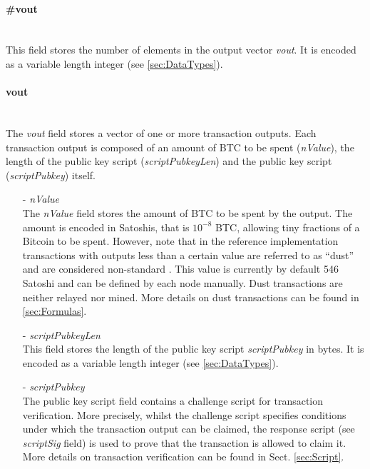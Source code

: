 \paragraph{\#vout}~\\
This field stores the number of elements in the output vector \textit{vout}. It is encoded as a variable length integer (see \ref{sec:DataTypes}).

\paragraph{vout}~\\
The \textit{vout} field stores a vector of one or more transaction outputs. Each transaction output is composed of an amount of BTC to be spent (\textit{nValue}), the length of the public key script (\textit{scriptPubkeyLen}) and the public key script (\textit{scriptPubkey}) itself.

\begin{itemize}
\item[-] \textit{nValue}~\\
The \textit{nValue} field stores the amount of BTC to be spent by the output. The amount is encoded in Satoshis, that is $10^{-8}$ BTC, allowing tiny fractions of a Bitcoin to be spent. However, note that in the reference implementation transactions with outputs less than a certain value are referred to as ``dust'' and are considered non-standard \cite{DustTransactions}. This value is currently by default 546 Satoshi and can be defined by each node manually. Dust transactions are neither relayed nor mined. More details on dust transactions can be found in \ref{sec:Formulas}.

\item[-] \textit{scriptPubkeyLen}~\\
This field stores the length of the public key script \textit{scriptPubkey} in bytes. It is encoded as a variable length integer (see \ref{sec:DataTypes}).

\item[-] \textit{scriptPubkey}~\\
The public key script field contains a challenge script for transaction verification. More precisely, whilst the challenge script specifies conditions under which the transaction output can be claimed, the response script (see \textit{scriptSig} field) is used to prove that the transaction is allowed to claim it. More details on transaction verification can be found in Sect. \ref{sec:Script}.

\end{itemize}

